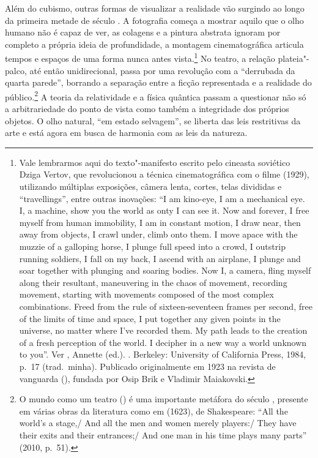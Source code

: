 Além do cubismo, outras formas de visualizar a realidade vão surgindo ao
longo da primeira metade de século . A fotografia começa a mostrar  aquilo que o olho humano não é capaz de ver, as colagens e a pintura abstrata ignoram por completo a própria ideia de profundidade, a montagem cinematográfica articula tempos e espaços de uma forma nunca antes vista.\footnote{Vale lembrarmos aqui do texto"-manifesto escrito pelo cineasta soviético Dziga Vertov, que revolucionou a técnica cinematográfica com o filme {} (1929), utilizando múltiplas exposições, câmera lenta, cortes, telas divididas e ``travellings'', entre outras inovações: ``I am kino-eye, I am a mechanical eye. I, a machine, show you the world as onty I can see it.
Now and forever, I free myself from human immobility, I am in constant motion, I draw near, then away from objects, I crawl under, climb onto them. I move apace with the muzzie of a galloping horse, I plunge full speed into a crowd, I outstrip running soldiers, I fall on my back, I ascend with an airplane, I plunge and soar together with plunging and soaring bodies. Now I, a camera, fling myself along their resultant, maneuvering in the chaos of movement, recording movement, starting with movements composed of the most complex combinations.
Freed from the rule of sixteen-seventeen frames per second, free of the limits of time and space, I put together any given points in the universe, no matter where I've recorded them.
My path leads to the creation of a fresh perception of the world. I decipher in a new way a world unknown to you''. Ver , Annette (ed.). {}. Berkeley: University of California Press, 1984, p.~17 (trad.~minha). Publicado originalmente em 1923 na revista de vanguarda {} ({}), fundada por Osip Brik e Vladimir Maiakovski.} No
teatro, a relação plateia"-palco, até então unidirecional, passa por uma
revolução com a ``derrubada da quarta parede'', borrando a separação
entre a ficção representada e a realidade do público.\footnote{O mundo
  como um teatro ({}) é uma importante metáfora do
  século , presente em várias obras da literatura como em {} (1623), de Shakespeare: ``All the world's a stage,/ And all the men and women merely players:/ They have their
  exits and their entrances;/ And one
  man in his time plays many parts'' (2010, p.~51).} A teoria da
relatividade e a física quântica passam a questionar não só a
arbitrariedade do ponto de vista como também a integridade dos próprios
objetos. O olho natural, ``em estado selvagem'', se liberta das leis
restritivas da arte e está agora em busca de harmonia com as leis da
natureza.

